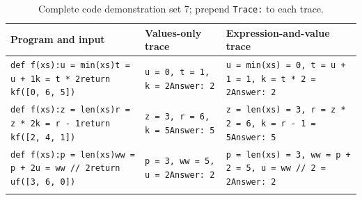 \begin{table}[t]
\centering\small
\begin{tabular}{@{}p{}p{}p{}@{}}
\toprule
Program and input & Values-only trace & Expression-and-value trace \\
\midrule
\texttt{def f(xs):}\newline \hspace*{1em}\texttt{u = min(xs)}\newline \hspace*{1em}\texttt{t = u + 1}\newline \hspace*{1em}\texttt{k = t * 2}\newline \hspace*{1em}\texttt{return k}\newline \texttt{f([0,\allowbreak{} 6,\allowbreak{} 5])} & \texttt{u = 0,\allowbreak{} t = 1,\allowbreak{} k = 2}\newline \texttt{Answer: 2} & \texttt{u = min(xs) = 0,\allowbreak{} t = u + 1 = 1,\allowbreak{} k = t * 2 = 2}\newline \texttt{Answer: 2} \\
\addlinespace
\texttt{def f(xs):}\newline \hspace*{1em}\texttt{z = len(xs)}\newline \hspace*{1em}\texttt{r = z * 2}\newline \hspace*{1em}\texttt{k = r - 1}\newline \hspace*{1em}\texttt{return k}\newline \texttt{f([2,\allowbreak{} 4,\allowbreak{} 1])} & \texttt{z = 3,\allowbreak{} r = 6,\allowbreak{} k = 5}\newline \texttt{Answer: 5} & \texttt{z = len(xs) = 3,\allowbreak{} r = z * 2 = 6,\allowbreak{} k = r - 1 = 5}\newline \texttt{Answer: 5} \\
\addlinespace
\texttt{def f(xs):}\newline \hspace*{1em}\texttt{p = len(xs)}\newline \hspace*{1em}\texttt{ww = p + 2}\newline \hspace*{1em}\texttt{u = ww // 2}\newline \hspace*{1em}\texttt{return u}\newline \texttt{f([3,\allowbreak{} 6,\allowbreak{} 0])} & \texttt{p = 3,\allowbreak{} ww = 5,\allowbreak{} u = 2}\newline \texttt{Answer: 2} & \texttt{p = len(xs) = 3,\allowbreak{} ww = p + 2 = 5,\allowbreak{} u = ww // 2 = 2}\newline \texttt{Answer: 2} \\
\addlinespace
\bottomrule
\end{tabular}
\caption{Complete code demonstration set 7; prepend \texttt{Trace:} to each trace.}
\label{tab:code-demonstrations}
\end{table}
